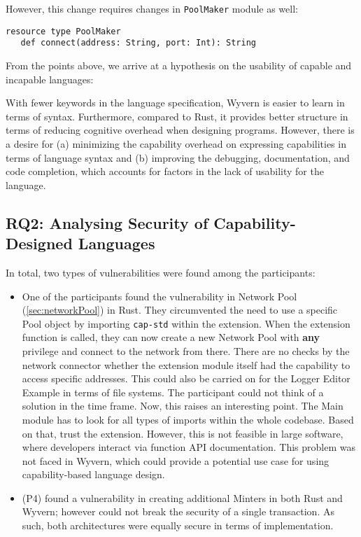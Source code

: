 \noindent
However, this change requires changes in \texttt{PoolMaker} module as well:
\begin{verbatim}
resource type PoolMaker
   def connect(address: String, port: Int): String
\end{verbatim}

\noindent
From the points above, we arrive at a hypothesis on the usability of capable and incapable languages: 

\begin{hyp}[Usability]
With fewer keywords in the language specification, Wyvern is easier to learn in terms of syntax. Furthermore, compared to Rust, it provides better structure in terms of reducing cognitive overhead when designing programs. However, there is a desire for (a) minimizing the capability overhead on expressing capabilities in terms of language syntax and (b) improving the debugging, documentation, and code completion, which accounts for factors in the lack of usability for the language.
\end{hyp}

\subsection{RQ2: Analysing Security of Capability-Designed Languages}
\noindent
In total, two types of vulnerabilities were found among the participants:
\begin{itemize}
    \item One of the participants found the vulnerability in Network Pool (\ref{sec:networkPool}) in Rust. They circumvented the need to use a specific Pool object by importing \texttt{cap-std} within the extension. When the extension function is called, they can now create a new Network Pool with \textbf{any} privilege and connect to the network from there. There are no checks by the network connector whether the extension module itself had the capability to access specific addresses. This could also be carried on for the Logger Editor Example in terms of file systems. The participant could not think of a solution in the time frame. Now, this raises an interesting point. The Main module has to look for all types of imports within the whole codebase. Based on that, trust the extension. However, this is not feasible in large software, where developers interact via function API documentation. This problem was not faced in Wyvern, which could provide a potential use case for using capability-based language design.
    \item (P4) found a vulnerability in creating additional Minters in both Rust and Wyvern; however could not break the security of a single transaction. As such, both architectures were equally secure in terms of implementation. 
\end{itemize}

